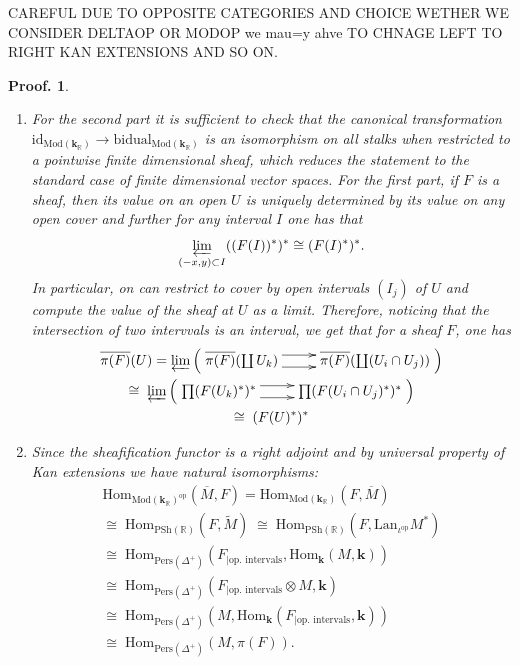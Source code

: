 \documentclass[a4paper, english, 11pt]{article}
\newcommand{\kk}[0]{\textbf{k}}
\newcommand{\Mod}[0]{\text{Mod}}
\newcommand{\Pe}{\text{Pers}}
\newcommand{\0}{\vec{0}}
\newcommand{\R}[0]{\mathbb{R}}
\newcommand{\op}[0]{\text{op}}
\newcommand{\Hom}[0]{\text{Hom}}
\newtheorem*{pf}{Proof.} }
\begin{document}
CAREFUL DUE TO OPPOSITE CATEGORIES AND CHOICE WETHER WE CONSIDER DELTAOP OR MODOP we mau=y ahve TO CHNAGE LEFT TO RIGHT KAN EXTENSIONS AND SO ON. 
\begin{pf}
\begin{enumerate}
    \item For the second part it is sufficient to check that the canonical transformation $\text{id}_{\Mod(\kk_\R)} \to \text{bidual}_{\Mod(\kk_\R)}$ is an isomorphism on all stalks when restricted to a pointwise finite dimensional sheaf, which reduces the statement to the standard case of finite dimensional vector spaces.  For the first part, if $F$ is a sheaf, then its value on an open $U$ is uniquely determined by its value on any open cover and further for any interval $I$ one has that $$\varprojlim_{(-x,y)\subset I} ((F(I))^*)^* \cong (F(I)^*)^*.$$ In particular, on can restrict to cover by open intervals $(I_j)$ of $U$ and compute the value of the sheaf at $U$ as a limit.
   Therefore, noticing that the intersection of two intervvals is an interval, we get that for a sheaf $F$, one has 
   \begin{multline*}\overline{\pi(F)}(U) = \varprojlim \Big(\xymatrix{\overline{\pi(F)}(\coprod U_k) \ar@<1ex>[r] \ar@<-1ex>[r] & \overline{\pi(F)}(\coprod (U_i \cap U_j)) } \Big) \\ 
   \cong \; \varprojlim \Big(\xymatrix{\prod (F(U_k)^*)^* \ar@<1ex>[r] \ar@<-1ex>[r] & \prod(F(U_i \cap U_j)^*)^* } \Big) \\ \cong \; (F(U)^*)^*
   \end{multline*}
   \item Since the sheafification functor is a right adjoint and by universal property of Kan extensions  we have natural isomorphisms:
   \begin{multline*}
  \Hom_{\Mod(\kk_\R)^{\op}}(\overline{M}, F)  = \Hom_{\Mod(\kk_\R)}(F,\overline{M})    \\ \cong \;
  \Hom_{\text{PSh}(\R)}(F, \tilde{M}) \; \cong \; \Hom_{\text{PSh}(\R)}(F, \text{Lan}_{\iota^{\op}} M^*) \\ \cong \; \Hom_{\Pe(\Delta^+)}(F_{ | \text{op. intervals} }, \Hom_{\kk}(M, \kk)) \\ \cong \; \Hom_{\Pe(\Delta^+)}(F_{ | \text{op. intervals} }\otimes M, \kk) \\ \cong \; 
  \Hom_{\Pe(\Delta^+)}(M, \Hom_{\kk}(F_{ | \text{op. intervals} }, \kk)) \\ \cong \; 
 \Hom_{\Pe(\Delta^+)}(M, \pi(F)). 
   \end{multline*}

\end{enumerate}
\end{pf}
\end{document}
